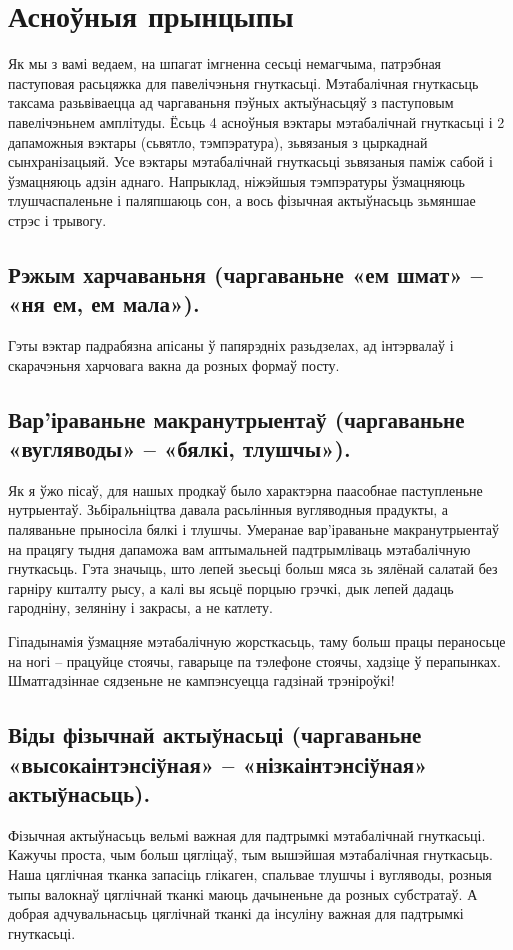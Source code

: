 \section{Асноўныя прынцыпы}

Як мы з вамі ведаем, на шпагат імгненна сесьці немагчыма, патрэбная паступовая расьцяжка для павелічэньня гнуткасьці. Мэтабалічная гнуткасьць таксама разьвіваецца ад чаргаваньня пэўных актыўнасьцяў з паступовым павелічэньнем амплітуды. Ёсьць 4 асноўныя вэктары мэтабалічнай гнуткасьці і 2 дапаможныя вэктары (сьвятло, тэмпэратура), зьвязаныя з цыркаднай сынхранізацыяй. Усе вэктары мэтабалічнай гнуткасьці зьвязаныя паміж сабой і ўзмацняюць адзін аднаго. Напрыклад, ніжэйшыя тэмпэратуры ўзмацняюць тлушчаспаленьне і паляпшаюць сон, а вось фізычная актыўнасьць зьмяншае стрэс і трывогу.

\subsection{Рэжым харчаваньня (чаргаваньне «ем шмат» – «ня ем, ем мала»).}
Гэты вэктар падрабязна апісаны ў папярэдніх разьдзелах, ад інтэрвалаў і скарачэньня харчовага вакна да розных формаў посту.

\subsection{Вар'іраваньне макранутрыентаў (чаргаваньне «вугляводы» – «бялкі, тлушчы»).}
Як я ўжо пісаў, для нашых продкаў было характэрна паасобнае паступленьне нутрыентаў. Зьбіральніцтва давала расьлінныя вугляводныя прадукты, а паляваньне прыносіла бялкі і тлушчы. Умеранае вар'іраваньне макранутрыентаў на працягу тыдня дапаможа вам аптымальней падтрымліваць мэтабалічную гнуткасьць. Гэта значыць, што лепей зьесьці больш мяса зь зялёнай салатай без гарніру кшталту рысу, а калі вы ясьцё порцыю грэчкі, дык лепей дадаць гародніну, зеляніну і закрасы, а не катлету.

Гіпадынамія ўзмацняе мэтабалічную жорсткасьць, таму больш працы пераносьце на ногі – працуйце стоячы, гаварыце па тэлефоне стоячы, хадзіце ў перапынках. Шматгадзіннае сядзеньне не кампэнсуецца гадзінай трэніроўкі!

\subsection{Віды фізычнай актыўнасьці (чаргаваньне «высокаінтэнсіўная» – «нізкаінтэнсіўная» актыўнасьць).}
Фізычная актыўнасьць вельмі важная для падтрымкі мэтабалічнай гнуткасьці. Кажучы проста, чым больш цягліцаў, тым вышэйшая мэтабалічная гнуткасьць. Наша цяглічная тканка запасіць глікаген, спальвае тлушчы і вугляводы, розныя тыпы валокнаў цяглічнай тканкі маюць дачыненьне да розных субстратаў. А добрая адчувальнасьць цяглічнай тканкі да інсуліну важная для падтрымкі гнуткасьці.

